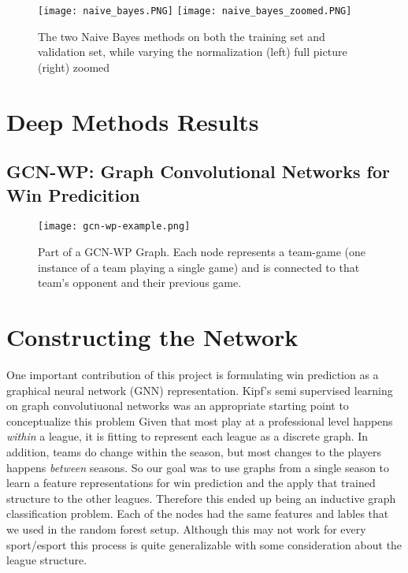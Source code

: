 \documentclass{article}
\begin{document}
\begin{figure}[h!]
    \centering
    \texttt{[image: naive\_bayes.PNG]} \quad
    \texttt{[image: naive\_bayes\_zoomed.PNG]}
    \caption{The two Naive Bayes methods on both the training set and validation set, while varying the normalization (left) full picture (right) zoomed}
\end{figure}

\section{Deep Methods Results}

\subsection{GCN-WP: Graph Convolutional Networks for Win Predicition}

\begin{figure}[h!]
\centering
\texttt{[image: gcn-wp-example.png]}
\caption{Part of a GCN-WP Graph. Each node represents a team-game (one instance of a team playing a single game) and is connected to that team's opponent and their previous game.}
\end{figure}

\section{Constructing the Network}

One important contribution of this project is formulating win prediction as a graphical neural network (GNN) representation. 
Kipf's semi supervised learning on graph convolutiuonal networks was an appropriate starting point to conceptualize this problem \cite{Kipf2017}
Given that most play at a professional level happens \emph{within} a league, it is fitting to represent each league as a discrete graph. 
In addition, teams do change within the season, but most changes to the players happens \emph{between} seasons. 
So our goal was to use graphs from a single season to learn a feature representations for win prediction and the apply that trained structure to the other leagues. 
Therefore this ended up being an inductive graph classification problem.
Each of the nodes had the same features and lables that we used in the random forest setup.
Although this may not work for every sport/esport this process is quite generalizable with some consideration about the league structure. 
\end{document}
